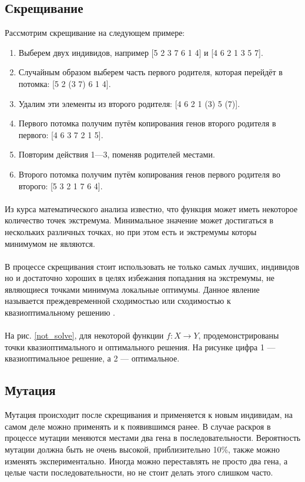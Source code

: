 \documentclass[14pt]{extarticle}
\begin{document}
	\subsection{Скрещивание}
	Рассмотрим скрещивание на следующем примере:
	\begin{enumerate}
		\item Выберем двух индивидов, например [5 2 3 7 6 1 4] и [4 6 2 1 3 5 7].
		\item Случайным образом выберем часть первого родителя, которая перейдёт в потомка: [5
		2 (3 7) 6 1 4].
		\item Удалим эти элементы из второго родителя: [4 6 2 1 (3) 5 (7)].
		\item Первого потомка получим путём копирования генов второго родителя в первого: [4 6
		3 7 2 1 5].
		\item Повторим действия 1---3, поменяв родителей местами.
		\item Второго потомка получим путём копирования генов первого родителя во второго: [5
		3 2 1 7 6 4].
	\end{enumerate}
	\paragraph{}
	Из курса математического анализа известно, что функция может иметь некоторое количество точек экстремума. Минимальное значение может достигаться в нескольких различных точках, но при этом есть и экстремумы которы минимумом не являются. 
	\paragraph{}
	В процессе скрещивания стоит использовать не только самых лучших, индивидов но и достаточно хороших в целях избежания попадания на экстремумы, не являющиеся точками минимума локальные оптимумы. Данное явление называется преждевременной сходимостью или сходимостью к квазиоптимальному решению \cite{GA}.
	\paragraph{}
	На рис. \ref{not_solve}, для некоторой функции $f:X\to Y$, продемонстрированы точки квазиоптимального и оптимального решения. На рисунке цифра 1 --- квазиоптимальное решение, а 2 --- оптимальное. 
	
	\subsection{Мутация}
	Мутация происходит после скрещивания и применяется к новым индивидам, на самом деле можно применять и к появившимся ранее. В случае раскроя в процессе мутации меняются местами два гена в последовательности. Вероятность мутации должна быть не очень высокой, приблизительно 10\%, также можно изменять экспериментально. Иногда можно переставлять не просто два гена, а целые части последовательности, но не стоит делать этого слишком часто.
\end{document}

